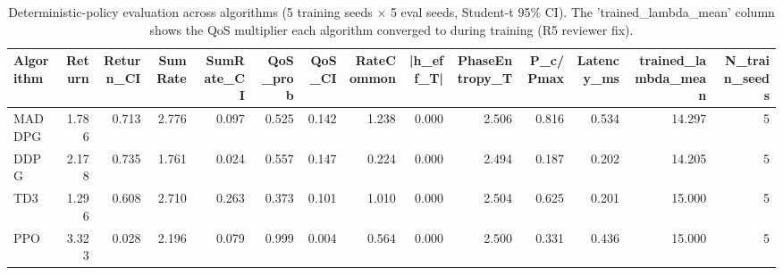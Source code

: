 \begin{table}[t]
\centering
\caption{Deterministic-policy evaluation across algorithms (5 training seeds × 5 eval seeds, Student-t 95\% CI). The 'trained\_lambda\_mean' column shows the QoS multiplier each algorithm converged to during training (R5 reviewer fix).}
\label{tab:algorithm_comparison}
\begin{tabular}{lrrrrrrrrrrrrr}
\toprule
Algorithm & Return & Return\_CI & SumRate & SumRate\_CI & QoS\_prob & QoS\_CI & RateCommon & |h\_eff\_T| & PhaseEntropy\_T & P\_c/Pmax & Latency\_ms & trained\_lambda\_mean & N\_train\_seeds \\
\midrule
MADDPG & 1.786 & 0.713 & 2.776 & 0.097 & 0.525 & 0.142 & 1.238 & 0.000 & 2.506 & 0.816 & 0.534 & 14.297 & 5 \\
DDPG & 2.178 & 0.735 & 1.761 & 0.024 & 0.557 & 0.147 & 0.224 & 0.000 & 2.494 & 0.187 & 0.202 & 14.205 & 5 \\
TD3 & 1.296 & 0.608 & 2.710 & 0.263 & 0.373 & 0.101 & 1.010 & 0.000 & 2.504 & 0.625 & 0.201 & 15.000 & 5 \\
PPO & 3.323 & 0.028 & 2.196 & 0.079 & 0.999 & 0.004 & 0.564 & 0.000 & 2.500 & 0.331 & 0.436 & 15.000 & 5 \\
\bottomrule
\end{tabular}

\end{table}
